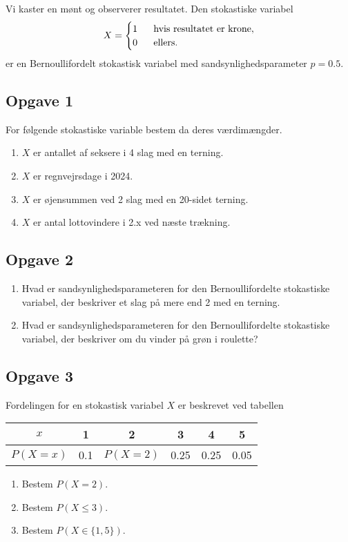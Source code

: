 \begin{exa}
	Vi kaster en mønt og observerer resultatet. Den stokastiske variabel
	\begin{align*}
		X = \begin{cases}
			1 \ &\textnormal{ hvis resultatet er krone}, \\
			0 \ &\textnormal{ ellers.}
		\end{cases}
	\end{align*}
	er en Bernoullifordelt stokastisk variabel med sandsynlighedsparameter $p = 0.5$.
\end{exa}

\subsection*{Opgave 1}
For følgende stokastiske variable bestem da deres værdimængder.
\begin{enumerate}[label=\roman*)]
	\item $X$ er antallet af seksere i 4 slag med en terning.
	\item $X$ er regnvejrsdage i 2024.
	\item $X$ er øjensummen ved 2 slag med en 20-sidet terning.
	\item $X$ er antal lottovindere i 2.x ved næste trækning.
\end{enumerate}

\subsection*{Opgave 2}
\begin{enumerate}[label=\roman*)]
	\item Hvad er sandsynlighedsparameteren for den Bernoullifordelte stokastiske variabel, der beskriver et slag på mere end 2 med en terning.
	\item Hvad er sandsynlighedsparameteren for den Bernoullifordelte stokastiske variabel, der beskriver om du vinder på grøn i roulette?
\end{enumerate}

\subsection*{Opgave 3}

Fordelingen for en stokastisk variabel $X$ er beskrevet ved tabellen
\begin{center}
	\begin{tabular}{c|c|c|c|c|c}
		$x$ & 1 & 2 & 3 & 4 & 5 \\
		\hline
		$P(X = x)$ & 0.1 & $P(X = 2)$ & 0.25 & 0.25 & 0.05 
	\end{tabular}
\end{center}
\begin{enumerate}[label=\roman*)]
	\item Bestem $P(X = 2)$.
	\item Bestem $P(X \leq 3)$.
	\item Bestem $P(X \in \{1,5\})$.
\end{enumerate}

